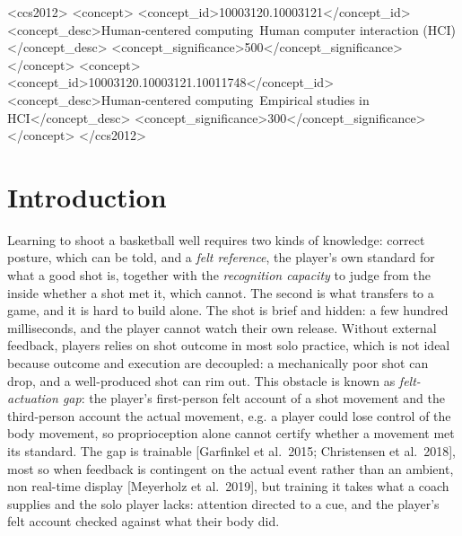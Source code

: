\documentclass[sigconf]{acmart}
\begin{document}
\begin{CCSXML}
<ccs2012>
   <concept>
       <concept_id>10003120.10003121</concept_id>
       <concept_desc>Human-centered computing~Human computer interaction (HCI)</concept_desc>
       <concept_significance>500</concept_significance>
       </concept>
   <concept>
       <concept_id>10003120.10003121.10011748</concept_id>
       <concept_desc>Human-centered computing~Empirical studies in HCI</concept_desc>
       <concept_significance>300</concept_significance>
       </concept>
</ccs2012>
\end{CCSXML}



\maketitle

\section{Introduction}

Learning to shoot a basketball well requires two kinds of knowledge: correct posture, which can be told, and a \emph{felt reference}, the player's own standard for what a good shot is, together with the \emph{recognition capacity} to judge from the inside whether a shot met it, which cannot. The second is what transfers to a game, and it is hard to build alone. The shot is brief and hidden: a few hundred milliseconds, and the player cannot watch their own release. Without external feedback, players relies on shot outcome in most solo practice, which is not ideal because outcome and execution are decoupled: a mechanically poor shot can drop, and a well-produced shot can rim out. This obstacle is known as \emph{felt-actuation gap}: the player's first-person felt account of a shot movement and the third-person account the actual movement, e.g. a player could lose control of the body movement, so proprioception alone cannot certify whether a movement met its standard. The gap is trainable [Garfinkel et al.\ 2015; Christensen et al.\ 2018], most so when feedback is contingent on the actual event rather than an ambient, non real-time display [Meyerholz et al.\ 2019], but training it takes what a coach supplies and the solo player lacks: attention directed to a cue, and the player's felt account checked against what their body did. 
\end{document}
